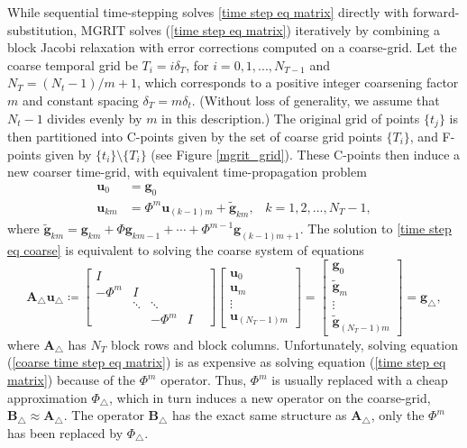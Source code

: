 \documentclass[VANCOUVER,STIX1COL]{WileyNJD-v2}
\begin{document}
While sequential time-stepping solves \eqref{time step eq matrix} directly with forward-substitution, MGRIT solves (\ref{time step eq matrix}) iteratively by combining a block Jacobi relaxation with error corrections computed on a coarse-grid. Let the coarse temporal grid be $T_i = i \delta_T$, for $i=0,1,...,N_{T-1}$ and $N_T = (N_t-1)/m+1$, which corresponds to a positive integer coarsening factor $m$ and constant spacing $\delta_T = m \delta_t$. (Without loss of generality, we assume that $N_t-1$ divides evenly by $m$ in this description.) The original grid of points $\{t_j\}$ is then partitioned into C-points given by the set of coarse grid points $\{T_i\}$, and F-points given by $\{t_i\} \setminus \{T_i\}$ (see Figure \ref{mgrit_grid}). These C-points then induce a new coarser time-grid, with equivalent time-propagation problem
\begin{equation}\label{time step eq coarse}
\begin{aligned}
\mathbf{u}_0 &= \mathbf{g}_0 \\
\mathbf{u}_{km} &= \Phi^m \mathbf{u}_{(k-1)m} + \tilde{\mathbf{g}}_{km}, \hspace{10pt} k=1,2,...,N_T-1,
\end{aligned}
\end{equation}
where $\tilde{\mathbf{g}}_{km} = \mathbf{g}_{km} + \Phi \mathbf{g}_{km-1} + \cdots + \Phi^{m-1} \mathbf{g}_{(k-1)m+1}$.
The solution to \eqref{time step eq coarse} is equivalent to solving the coarse system of equations
\begin{equation}\label{coarse time step eq matrix}
\mathbf{A_{\triangle} u_{\triangle}} \coloneqq  
\begin{bmatrix} 
I &  &  &  & \\
-\Phi^m & I &  &  &\\
& \ddots &  \ddots&  & \\
& & -\Phi^m & I
\end{bmatrix}
\begin{bmatrix}
\mathbf{u}_0\\ \mathbf{u}_m \\ \vdots \\ \mathbf{u}_{(N_T-1) m}
\end{bmatrix}=
\begin{bmatrix}
\mathbf{g}_0\\ \tilde{\mathbf{g}}_m \\ \vdots \\ \tilde{\mathbf{g}}_{(N_T-1) m}
\end{bmatrix} = \mathbf{g}_{\triangle},
\end{equation}
\normalsize
 where $\mathbf{A_{\triangle}}$ has $N_T$ block rows and block columns. Unfortunately, solving equation (\ref{coarse time step eq matrix}) is as expensive as solving equation (\ref{time step eq matrix}) because of the $\Phi^m$ operator.  Thus, $\Phi^m$ is usually replaced with a cheap approximation $\Phi_{\triangle}$, which in turn induces  a new operator on the coarse-grid, $\mathbf{B}_{\triangle} \approx \mathbf{A}_{\triangle}$.  The operator $\mathbf{B}_\triangle$ has the exact same structure as $\mathbf{A}_\triangle$, only the $\Phi^m$ has been replaced by $\Phi_\triangle$.
\end{document}
